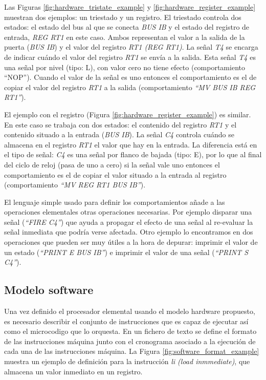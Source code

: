 Las Figuras \ref{fig:hardware_tristate_example} y \ref{fig:hardware_register_example} muestran dos ejemplos: un triestado y un registro.
El triestado controla dos estados: el estado del bus al que se conecta \emph{BUS IB} y el estado del registro de entrada, \emph{REG RT1} en este caso. Ambos representan el valor a la salida de la puerta (\emph{BUS IB}) y el valor del registro \emph{RT1 (REG RT1)}. La señal \emph{T4} se encarga de indicar cuándo el valor del registro \emph{RT1} se envía a la salida. Esta señal \emph{T4} es una señal por nivel (tipo: L), con valor cero no tiene efecto (comportamiento ``NOP''). Cuando el valor de la señal es uno entonces el comportamiento es el de copiar el valor del registro \emph{RT1} a la salida (comportamiento \emph{``MV BUS IB REG RT1''}).

El ejemplo con el registro (Figura \ref{fig:hardware_register_example}) es similar. En este caso se trabaja con dos estados: el contenido del registro \emph{RT1} y el contenido situado a la entrada (\emph{BUS IB}). La señal \emph{C4} controla cuándo se almacena en el registro \emph{RT1} el valor que hay en la entrada. La diferencia está en el tipo de señal: \emph{C4} es una señal por flanco de bajada (tipo: E), por lo que al final del ciclo de reloj (pasa de uno a cero) si la señal vale uno entonces el comportamiento es el de copiar el valor situado a la entrada al registro (comportamiento \emph{``MV REG RT1 BUS IB''}).

El lenguaje simple usado para definir los comportamientos añade a las operaciones elementales otras operaciones necesarias. Por ejemplo disparar una señal (\emph{``FIRE C4''}) que ayuda a propagar el efecto de una señal al re-evaluar la señal inmediata que podría verse afectada. Otro ejemplo lo encontramos en dos operaciones que pueden ser muy útiles a la hora de depurar: imprimir el valor de un estado (\emph{``PRINT E BUS IB''}) e imprimir el valor de una señal (\emph{``PRINT S C4''}).

\subsection{Modelo \gls{software}}

Una vez definido el procesador elemental usando el modelo \gls{hardware} propuesto, es necesario describir el conjunto de instrucciones que es capaz de ejecutar así como el \gls{microcodigo} que lo orquesta. En un fichero de texto se define el formato de las instrucciones máquina junto con el cronograma asociado a la ejecución de cada una de las instrucciones máquina. La Figura \ref{fig:software_format_example} muestra un ejemplo de definición para la instrucción \emph{li (load inmmediate)}, que almacena un valor inmediato en un registro.

